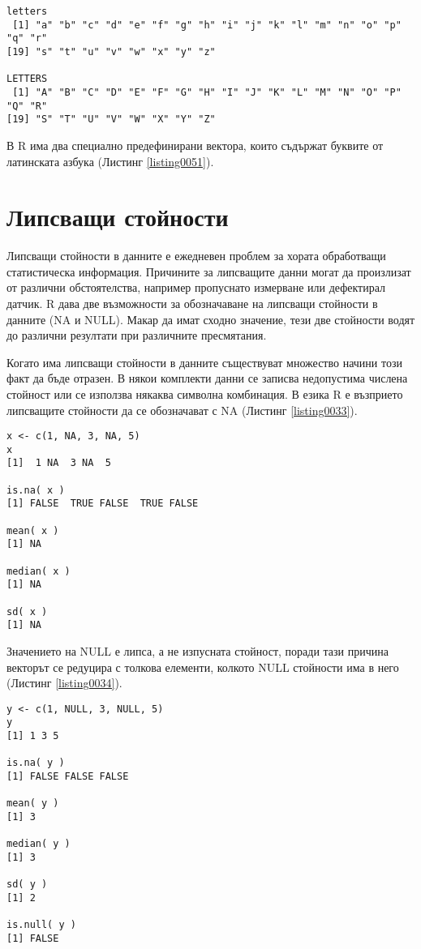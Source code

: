 \begin{lstlisting}[caption=Вектори с латинските букви, label=listing0051]
letters
 [1] "a" "b" "c" "d" "e" "f" "g" "h" "i" "j" "k" "l" "m" "n" "o" "p" "q" "r"
[19] "s" "t" "u" "v" "w" "x" "y" "z"

LETTERS
 [1] "A" "B" "C" "D" "E" "F" "G" "H" "I" "J" "K" "L" "M" "N" "O" "P" "Q" "R"
[19] "S" "T" "U" "V" "W" "X" "Y" "Z"
\end{lstlisting}

В R има два специално предефинирани вектора, които съдържат буквите от латинската азбука (Листинг \ref{listing0051}).

\section{Липсващи стойности}

Липсващи стойности в данните е ежедневен проблем за хората обработващи статистическа информация. Причините за липсващите данни могат да произлизат от различни обстоятелства, например пропуснато измерване или дефектирал датчик. R дава две възможности за обозначаване на липсващи стойности в данните (NA и NULL). Макар да имат сходно значение, тези две стойности водят до различни резултати при различните пресмятания.

Когато има липсващи стойности в данните съществуват множество начини този факт да бъде отразен. В някои комплекти данни се записва недопустима числена стойност или се използва някаква символна комбинация. В езика R е възприето липсващите стойности да се обозначават с NA (Листинг \ref{listing0033}).

\begin{lstlisting}[caption=Липсващи стойности, label=listing0033]
x <- c(1, NA, 3, NA, 5)
x
[1]  1 NA  3 NA  5

is.na( x )
[1] FALSE  TRUE FALSE  TRUE FALSE

mean( x )
[1] NA

median( x )
[1] NA

sd( x )
[1] NA
\end{lstlisting}

Значението на NULL е липса, а не изпусната стойност, поради тази причина векторът се редуцира с толкова елементи, колкото NULL стойности има в него (Листинг \ref{listing0034}).

\begin{lstlisting}[caption=Липсващи стойности, label=listing0034]
y <- c(1, NULL, 3, NULL, 5)
y
[1] 1 3 5

is.na( y )
[1] FALSE FALSE FALSE

mean( y )
[1] 3

median( y )
[1] 3

sd( y )
[1] 2

is.null( y )
[1] FALSE
\end{lstlisting}

